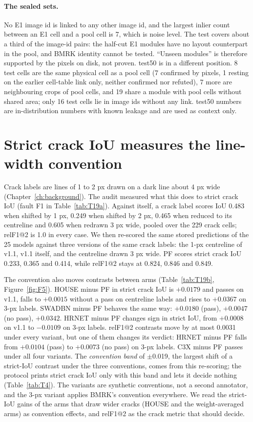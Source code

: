 \paragraph{The sealed sets.} No E1 image id is linked to any other image id, and the largest inlier count between an E1 cell and a
pool cell is 7, which is noise level. The test covers about a third of the image-id pairs: the half-cut E1 modules have no layout
counterpart in the pool, and BMRK identity cannot be tested. ``Unseen modules'' is therefore supported by the pixels on disk, not
proven. test50 is in a different position. 8 test cells are the same physical cell as a pool cell (7 confirmed by pixels, 1 resting
on the earlier cell-table link only, neither confirmed nor refuted), 7 more are neighbouring crops of pool cells, and 19 share a
module with pool cells without shared area; only 16 test cells lie in image ids without any link. test50 numbers are
in-distribution numbers with known leakage and are used as context only.

\section{Strict crack IoU measures the line-width convention}\label{sec:data-f1}

Crack labels are lines of 1 to 2 px drawn on a dark line about 4 px wide (Chapter~\ref{ch:background}). The audit measured what
this does to strict crack IoU (fault F1 in Table~\ref{tab:T19a}). Against itself, a crack label scores IoU 0.483 when shifted by
1 px, 0.249 when shifted by 2 px, 0.465 when reduced to its centreline and 0.605 when redrawn 3 px wide, pooled over the 229 crack
cells; relF1@2 is 1.0 in every case. We then re-scored the same stored predictions of the 25 models against three versions of the
same crack labels: the 1-px centreline of v1.1, v1.1 itself, and the centreline drawn 3 px wide. PF scores strict crack IoU 0.233,
0.365 and 0.414, while relF1@2 stays at 0.824, 0.846 and 0.849.

The convention also moves contrasts between arms (Table~\ref{tab:T19b}, Figure~\ref{fig:F5}). HOUSE minus PF in strict crack IoU is $+0.0179$ and
passes on v1.1, falls to $+0.0015$ without a pass on centreline labels and rises to $+0.0367$ on 3-px labels. SWADBN minus PF behaves
the same way: $+0.0180$ (pass), $+0.0047$ (no pass), $+0.0342$. HRNET minus PF changes sign in strict IoU, from $+0.0008$ on v1.1 to
$-0.0109$ on 3-px labels. relF1@2 contrasts move by at most 0.0031 under every variant, but one of them changes its verdict: HRNET
minus PF falls from $+0.0104$ (pass) to $+0.0073$ (no pass) on 3-px labels. C3X minus PF passes under all four variants. The
\emph{convention band} of $\pm$0.019, the largest shift of a strict-IoU contrast under the three conventions, comes from this
re-scoring; the protocol prints strict crack IoU only with this band and lets it decide nothing (Table~\ref{tab:T4}). The variants
are synthetic conventions, not a second annotator, and the 3-px variant applies BMRK's convention everywhere. We read the
strict-IoU gains of the arms that draw wider cracks (HOUSE and the weight-averaged arms) as convention effects, and relF1@2 as the
crack metric that should decide.

